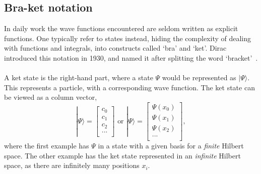 \subsection{Bra-ket notation}
In daily work the wave functions encountered are seldom written as explicit functions.
One typically refer to states instead, hiding the complexity of dealing with
functions and integrals, into constructs called `bra' and `ket'.
Dirac introduced this notation in 1930, and named it after splitting the word
`bracket'~\cite{bracket}.

\paragraph*{}
A ket state is the right-hand part, where a state $\Psi$ would be represented as $|\Psi \rangle$.
This represents a particle, with a corresponding
wave function.
The ket state can be viewed as a column vector,
\begin{equation}
\label{eq:qm:bra}
|\Psi \rangle = 
\begin{bmatrix}
c_0 \\
c_1 \\
c_2 \\
... \\
\end{bmatrix}
\textrm{ or }
|\Psi \rangle =
\begin{bmatrix}
\Psi(x_0) \\
\Psi(x_1) \\
\Psi(x_2) \\
... \\
\end{bmatrix} ,
\end{equation}
where the first example has $\Psi$ in a state with a given basis for a \textit{finite} Hilbert space.
The other example has the ket state represented in an \textit{infinite} Hilbert space, as there are
infinitely many positions $x_i$.

